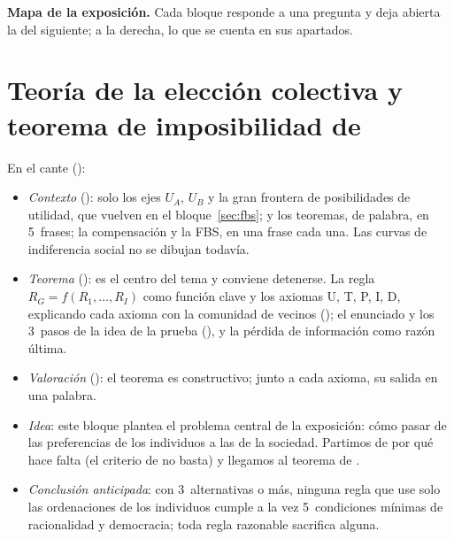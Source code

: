 \documentclass[11pt]{article}
\begin{document}
\begin{anotaciones}
\textbf{Mapa de la exposición.} Cada bloque responde a una pregunta y deja abierta la del siguiente; a la derecha, lo que se cuenta en sus apartados.
\begin{infografiacaja}
\caption{Mapa de la exposición: la pregunta de cada bloque y el hilo que los une}\label{figu:mapa-tema}
\end{infografiacaja}
\end{anotaciones}



\section{Teoría de la elección colectiva y teorema\cortetitulo{} de imposibilidad de }\label{sec:eleccion-arrow}

\begin{notaopositor}
En el cante ():
\begin{itemize}
\item \emph{Contexto} (): solo los ejes $U_A$, $U_B$ y la gran frontera de posibilidades de utilidad, que vuelven en el bloque~\ref{sec:fbs};  y los teoremas, de palabra, en 5~frases; la compensación y la FBS, en una frase cada una. Las curvas de indiferencia social no se dibujan todavía.
\item \emph{Teorema} (): es el centro del tema y conviene detenerse. La regla $R_G=f(R_1,\dots,R_I)$ como función clave y los axiomas U, T, P, I, D, explicando cada axioma con la comunidad de vecinos (); el enunciado y los 3~pasos de la idea de la prueba (), y la pérdida de información como razón última.
\item \emph{Valoración} (): el teorema es constructivo; junto a cada axioma, su salida en una palabra.
\end{itemize}
\end{notaopositor}

\begin{itemize}
\item \emph{Idea}: este bloque plantea el problema central de la exposición: cómo pasar de las preferencias de los individuos a las de la sociedad. Partimos de por qué hace falta (el criterio de  no basta) y llegamos al teorema de .
\item \emph{Conclusión anticipada}: con 3~alternativas o más, ninguna regla que use solo las ordenaciones de los individuos cumple a la vez 5~condiciones mínimas de racionalidad y democracia; toda regla razonable sacrifica alguna.
\end{itemize}
\end{document}
